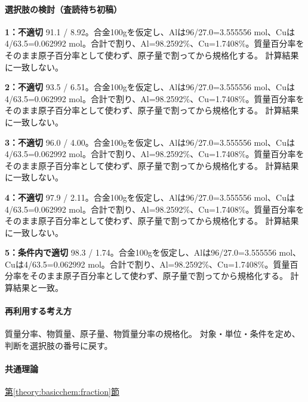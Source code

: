 \paragraph{選択肢の検討（査読待ち初稿）}\mbox{}\par

\noindent\textbf{1：不適切} 91.1 / 8.92。合金100gを仮定し、Alは96/27.0=\allowbreak{}3.555556 mol、Cuは4/63.5=\allowbreak{}0.062992 mol。合計で割り、Al=\allowbreak{}98.2592\%、Cu=\allowbreak{}1.7408\%。質量百分率をそのまま原子百分率として使わず、原子量で割ってから規格化する。 計算結果に一致しない。\par

\noindent\textbf{2：不適切} 93.5 / 6.51。合金100gを仮定し、Alは96/27.0=\allowbreak{}3.555556 mol、Cuは4/63.5=\allowbreak{}0.062992 mol。合計で割り、Al=\allowbreak{}98.2592\%、Cu=\allowbreak{}1.7408\%。質量百分率をそのまま原子百分率として使わず、原子量で割ってから規格化する。 計算結果に一致しない。\par

\noindent\textbf{3：不適切} 96.0 / 4.00。合金100gを仮定し、Alは96/27.0=\allowbreak{}3.555556 mol、Cuは4/63.5=\allowbreak{}0.062992 mol。合計で割り、Al=\allowbreak{}98.2592\%、Cu=\allowbreak{}1.7408\%。質量百分率をそのまま原子百分率として使わず、原子量で割ってから規格化する。 計算結果に一致しない。\par

\noindent\textbf{4：不適切} 97.9 / 2.11。合金100gを仮定し、Alは96/27.0=\allowbreak{}3.555556 mol、Cuは4/63.5=\allowbreak{}0.062992 mol。合計で割り、Al=\allowbreak{}98.2592\%、Cu=\allowbreak{}1.7408\%。質量百分率をそのまま原子百分率として使わず、原子量で割ってから規格化する。 計算結果に一致しない。\par

\noindent\textbf{5：条件内で適切} 98.3 / 1.74。合金100gを仮定し、Alは96/27.0=\allowbreak{}3.555556 mol、Cuは4/63.5=\allowbreak{}0.062992 mol。合計で割り、Al=\allowbreak{}98.2592\%、Cu=\allowbreak{}1.7408\%。質量百分率をそのまま原子百分率として使わず、原子量で割ってから規格化する。 計算結果と一致。\par

\paragraph{再利用する考え方} 質量分率、物質量、原子量、物質量分率の規格化。 対象・単位・条件を定め、判断を選択肢の番号に戻す。

\paragraph{共通理論} \hyperref[theory:basicchem:fraction]{第\ref*{theory:basicchem:fraction}節}

